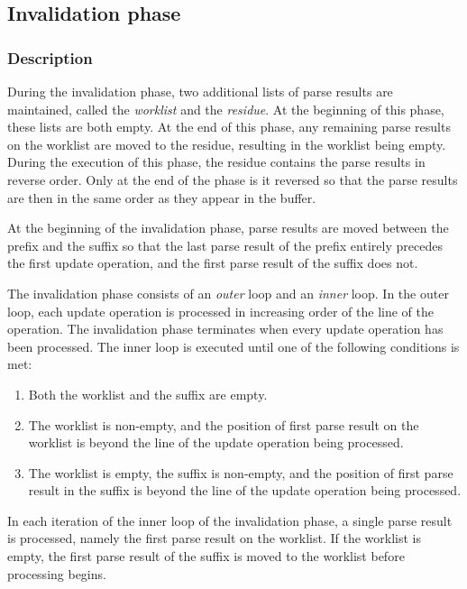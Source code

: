 \subsection{Invalidation phase}

\subsubsection{Description}

During the invalidation phase, two additional lists of parse results
are maintained, called the \emph{worklist} and the \emph{residue}.  At
the beginning of this phase, these lists are both empty.  At the end
of this phase, any remaining parse results on the worklist are moved
to the residue, resulting in the worklist being empty.  During the
execution of this phase, the residue contains the parse results in
reverse order.  Only at the end of the phase is it reversed so that
the parse results are then in the same order as they appear in the
buffer.

At the beginning of the invalidation phase, parse results are moved
between the prefix and the suffix so that the last parse result of the
prefix entirely precedes the first update operation, and the first
parse result of the suffix does not.

The invalidation phase consists of an \emph{outer} loop and an
\emph{inner} loop.  In the outer loop, each update operation is
processed in increasing order of the line of the operation.  The
invalidation phase terminates when every update operation has been
processed.  The inner loop is executed until one of the following
conditions is met:

\begin{enumerate}
\item Both the worklist and the suffix are empty.
\item The worklist is non-empty, and the position of first parse
  result on the worklist is beyond the line of the update operation
  being processed.
\item The worklist is empty, the suffix is non-empty, and the position
  of first parse result in the suffix is beyond the line of the update
  operation being processed.
\end{enumerate}

In each iteration of the inner loop of the invalidation phase, a
single parse result is processed, namely the first parse result on the
worklist.  If the worklist is empty, the first parse result of the
suffix is moved to the worklist before processing begins.

